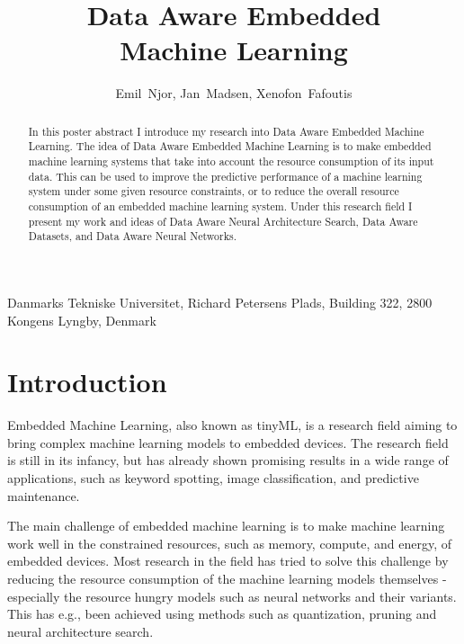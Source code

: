 \documentclass{acaces}
\begin{document}
\title{Data Aware Embedded \\Machine Learning
}

\author{
    Emil~Njor\comma{},
    Jan~Madsen\comma{},
    Xenofon~Fafoutis\comma{}
}

\address{1}{
    Danmarks Tekniske Universitet,
    Richard Petersens Plads,
    Building 322,
    2800 Kongens Lyngby,
    Denmark
}


\pagestyle{empty}


\begin{abstract}
    In this poster abstract I introduce my research into Data Aware Embedded Machine Learning.
    The idea of Data Aware Embedded Machine Learning is to make embedded machine learning systems that take into account the resource consumption of its input data.
    This can be used to improve the predictive performance of a machine learning system under some given resource constraints, or to reduce the overall resource consumption of an embedded machine learning system.
    Under this research field I present my work and ideas of Data Aware Neural Architecture Search, Data Aware Datasets, and Data Aware Neural Networks.
\end{abstract}
\newline
{}

\section{Introduction}
Embedded Machine Learning, also known as tinyML, is a research field aiming to bring complex machine learning models to embedded devices. 
The research field is still in its infancy, but has already shown promising results in a wide range of applications, such as keyword spotting, image classification, and predictive maintenance.

The main challenge of embedded machine learning is to make machine learning work well in the constrained resources, such as memory, compute, and energy, of embedded devices.
Most research in the field has tried to solve this challenge by reducing the resource consumption of the machine learning models themselves - especially the resource hungry models such as neural networks and their variants.
This has e.g., been achieved using methods such as quantization, pruning and neural architecture search\cite{njor2022primer}.
\end{document}

